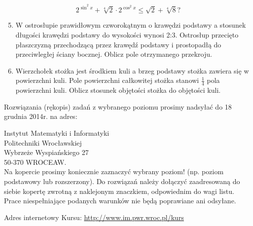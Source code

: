 \documentclass[10pt]{article}
\begin{document}
$$
2^{\sin ^{2} x}+\sqrt[4]{2} \cdot 2^{\cos ^{2} x} \leqslant \sqrt{2}+\sqrt[4]{8} ?
$$

\begin{enumerate}
  \setcounter{enumi}{4}
  \item W ostrosłupie prawidłowym czworokątnym o krawędzi podstawy a stosunek długości krawędzi podstawy do wysokości wynosi 2:3. Ostrosłup przecięto płaszczyzną przechodzącą przez krawędź podstawy i prostopadłą do przeciwległej ściany bocznej. Oblicz pole otrzymanego przekroju.
  \item Wierzchołek stożka jest środkiem kuli a brzeg podstawy stożka zawiera się w powierzchni kuli. Pole powierzchni całkowitej stożka stanowi $\frac{1}{4}$ pola powierzchni kuli. Oblicz stosunek objętości stożka do objętości kuli.
\end{enumerate}

Rozwiązania (rękopis) zadań z wybranego poziomu prosimy nadsyłać do 18 grudnia 2014r. na adres:

Instytut Matematyki i Informatyki\\
Politechniki Wrocławskiej\\
Wybrzeże Wyspiańskiego 27\\
50-370 WROCEAW.\\
Na kopercie prosimy koniecznie zaznaczyć wybrany poziom! (np. poziom podstawowy lub rozszerzony). Do rozwiązań należy dołączyć zaadresowaną do siebie kopertę zwrotną z naklejonym znaczkiem, odpowiednim do wagi listu. Prace niespełniające podanych warunków nie będą poprawiane ani odsyłane.

Adres internetowy Kursu: \href{http://www.im.pwr.wroc.pl/kurs}{http://www.im.pwr.wroc.pl/kurs}
\end{document}
